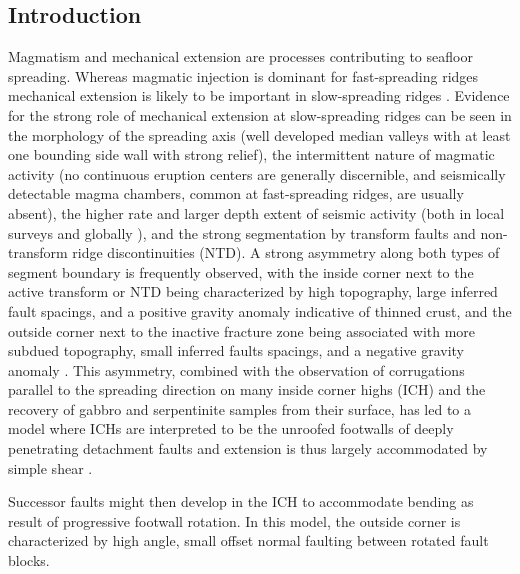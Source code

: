 \documentclass[jgr]{agu2001}
\newlength{\tw}
\begin{document}
\begin{article}

\section{Introduction}

Magmatism and mechanical extension are 
 processes contributing to  seafloor spreading.  Whereas magmatic injection is dominant for
fast-spreading ridges mechanical extension is likely to be important
in slow-spreading ridges  \citep{mutter92}.  Evidence for the strong
role of mechanical extension at slow-spreading ridges can be seen in the morphology of the
spreading axis (well developed median valleys with at least one
bounding side wall with strong relief), the intermittent nature of
magmatic activity (no continuous eruption centers are generally 
discernible, and seismically detectable magma chambers, common at
fast-spreading ridges, are usually absent), the higher rate and larger
depth extent of seismic activity (both in local surveys
\citep[e.g.,][]{toomey88} and globally \citep{huang88,rundquist02}),
and the strong segmentation by transform faults and non-transform
ridge discontinuities (NTD). A strong asymmetry along both types of
segment boundary is frequently observed, with the inside corner next
to the active transform or NTD being
characterized  by high topography, large inferred fault spacings, and a positive gravity anomaly
indicative of thinned crust, and the outside corner next to the
inactive fracture zone being associated with more subdued topography,
small inferred faults spacings, 
and a negative gravity anomaly \citep{shaw93,escartin95}. This asymmetry,
combined with the observation of corrugations parallel to the
spreading direction on many inside corner highs (ICH) and the
recovery of gabbro and serpentinite samples from their surface, has
led to a model where ICHs are interpreted to be the unroofed footwalls
of  deeply penetrating detachment faults and  extension
is thus largely accommodated by simple shear
\citep{tucholke94}. 

 Successor faults might then
develop in the ICH to accommodate bending as result of progressive footwall rotation.  In this model, the outside
corner is characterized by high angle, small offset normal faulting
between rotated fault blocks. 
 

\end{article}
\end{document}
